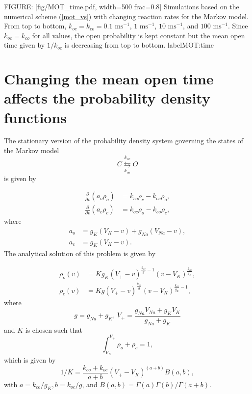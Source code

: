 FIGURE: [fig/MOT_time.pdf, width=500 frac=0.8] Simulations based on the numerical scheme (\ref{mot_vs}) with 
changing reaction rates for the Markov model.
From top to bottom, $k_{oc}=k_{co}=0.1\text{ ms}^{-1}$, $1 \text{ ms}^{-1}$, $10\text{ ms}^{-1}$, and $100 \text{ ms}^{-1}.$ 
Since $k_{oc}=k_{co}$ for all values, the open probability
is kept constant but the mean open time given by $1/k_{oc}$ is decreasing from top 
to bottom.  label{MOT:time}
\section[Changing MOT affects the PDFs]{Changing the mean open time affects the probability density functions}

The stationary version of the probability density system governing the states
of the Markov model
\[
C\underset{k_{co}}{\overset{k_{oc}}{\leftrightarrows}}O
\]
is given by

\begin{align}
\frac{\partial}{\partial v}\left(  a_{o}\rho_{o}\right)   &  =k_{co}\rho
_{c}-k_{oc}\rho_{o},\label{vpdf_mot}\\
\frac{\partial}{\partial v}\left(  a_{c}\rho_{c}\right)   &  =k_{oc}\rho
_{o}-k_{co}\rho_{c},\nonumber
\end{align}
where 
\begin{align}
a_{o}  &  =g_{K}(V_{K}-v)+g_{Na}(V_{Na}-v),\label{vflux_mot}\\
a_{c}  &  =g_{K}(V_{K}-v).\nonumber
\end{align}
The analytical solution of this problem is given by

\begin{align*}
\rho_{o}(v)  &  =Kg_{K}(V_{+}-v)^{\frac{k_{oc}}{g}-1}(v-V_{K})^{\frac{k_{co}
}{g_{K}}},\\
\rho_{c}(v)  &  =Kg(V_{+}-v)^{\frac{k_{oc}}{g}}(v-V_{K})^{\frac{k_{co}}{g_{K}}-1},
\end{align*}
where
\[
g=g_{Na}+g_{K}\text{, }V_{+}=\frac{g_{Na}V_{Na}+g_{K}V_{K}}{g_{Na}+g_{K}}
\]
and $K$ is chosen such that
\[
\int_{V_{K}}^{V_{+}}\rho_{o}+\rho_{c}=1,
\]
which is given by
\[
1/K=\frac{k_{co}+k_{oc}}{a+b} (V_+-V_K)^{(a+b)} B(a,b),
\]
with $a = k_{co}/g_{K}, b = k_{oc}/g$, and $B(a,b) =\Gamma(a)\Gamma(b)/\Gamma(a+b)$.


